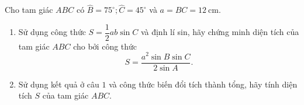 \begin{bt}%
	Cho tam giác $A B C$ có $\widehat{B}=75^{\circ}; \widehat{C}=45^{\circ}$ và $a=B C=12 \mathrm{~cm}$.
	\begin{enumerate}
		\item Sử dụng công thức $S=\dfrac{1}{2} a b \sin C$ và định lí sin, hãy chứng minh diện tích của tam giác $A B C$ cho bởi công thức
		$$
		S=\dfrac{a^2 \sin B \sin C}{2 \sin A} .
		$$
		\item Sử dụng kết quả ở câu $1$ và công thức biến đổi tích thành tổng, hãy tính diện tích $S$ của tam giác $A B C$.
	\end{enumerate}
\end{bt}

